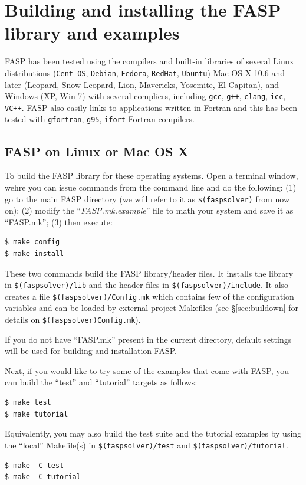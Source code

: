 \documentclass[11pt]{memoir}
\begin{document}
\section{Building and installing the FASP library and examples}\label{sec:build}

FASP has been tested using the compilers and built-in libraries of
several Linux distributions (\verb|Cent OS|, \verb|Debian|,
\verb|Fedora|, \verb|RedHat|, \verb|Ubuntu|) Mac OS X 10.6 and later
(Leopard, Snow Leopard, Lion, Mavericks, Yosemite, El Capitan), and
Windows (XP, Win 7) with several compliers, including \verb|gcc|,
\verb|g++|, \verb|clang|, \verb|icc|, \verb|VC++|. FASP also easily
links to applications written in Fortran and this has been tested with
\verb|gfortran|, \verb|g95|, \verb|ifort| Fortran compilers.

\subsection{FASP on Linux or Mac OS X}
To build the FASP library for these operating systems. Open a terminal
window, wehre you can issue commands from the command line and do the following: 
(1) go to the main FASP directory (we will refer to it as
\verb|$(faspsolver)| from now on); (2) modify the ``\emph{FASP.mk.example}''
file to math your system and save it as ``{\color{red}FASP.mk}''; (3) then execute:
%
\begin{lstlisting}[numbers=none]
$ make config 
$ make install
\end{lstlisting}
%
These two commands build the FASP library/header files. It installs
the library in \verb|$(faspsolver)/lib|
and the header files in \verb|$(faspsolver)/include|. It also creates a
file \verb|$(faspsolver)/Config.mk| which contains few of the configuration
variables and can be loaded by external project Makefiles (see
\S\ref{sec:buildown} for details on \verb|$(faspsolver)Config.mk|).

If you do not have ``FASP.mk'' present in the current directory,
default settings will be used for building and installation FASP. 

Next, if you would like to try some of the examples that come with
FASP, you can build the ``test'' and ``tutorial'' targets as follows:
%
\begin{lstlisting}[numbers=none]
$ make test
$ make tutorial
\end{lstlisting}
%
Equivalently, you may also build the test suite and the tutorial examples by using
the ``local'' Makefile(s) in \verb|$(faspsolver)/test|
and \verb|$(faspsolver)/tutorial|.
\begin{lstlisting}[numbers=none]
$ make -C test
$ make -C tutorial
\end{lstlisting}
\end{document}
